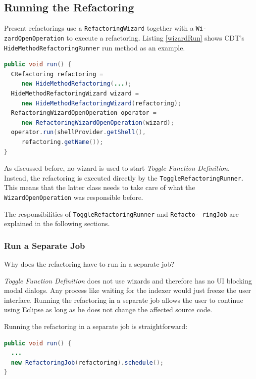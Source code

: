 \subsection{Running the Refactoring}\label{runnersec}
Present refactorings use a \texttt{RefactoringWizard} together with a 
\texttt{Wi- zardOpenOperation} to execute a refactoring. Listing \ref{wizardRun} 
shows CDT's \texttt{HideMethodRefactoringRunner} run method as an example.

\begin{lstlisting}[caption={shorted run method of HideMethodRefactoringRunner},label={wizardRun}, language=Java]
public void run() {
  CRefactoring refactoring = 
     new HideMethodRefactoring(...);
  HideMethodRefactoringWizard wizard = 
     new HideMethodRefactoringWizard(refactoring);
  RefactoringWizardOpenOperation operator = 
     new RefactoringWizardOpenOperation(wizard);
  operator.run(shellProvider.getShell(), 
     refactoring.getName());
}
\end{lstlisting}

As discussed before, no wizard is used to start \textit{Toggle Function 
Definition}. Instead, the refactoring is executed directly by the 
\texttt{ToggleRefactoringRunner}. This means that the latter class needs to take 
care of what the \texttt{WizardOpenOperation} was responsible before.

The responsibilities of \texttt{ToggleRefactoringRunner} and 
\texttt{Refacto- ringJob} are explained in the following sections.

\subsubsection{Run a Separate Job}
Why does the refactoring have to run in a separate job?

\textit{Toggle Function Definition} does not use wizards and therefore 
has no UI blocking modal dialogs. Any process like waiting for the indexer would 
just freeze the user interface. Running the refactoring in a separate job 
allows the user to continue using Eclipse as long as he does not change the 
affected source code.

Running the refactoring in a separate job is straightforward:
\begin{lstlisting}[caption={ToggleRefactoringRunner starting the job},
label={jobstart}, language=Java]
public void run() {
  ...
  new RefactoringJob(refactoring).schedule();
}
\end{lstlisting}

